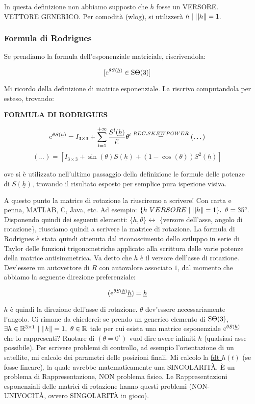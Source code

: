 In questa definizione non abbiamo supposto che $h$ fosse un VERSORE. VETTORE GENERICO. Per comodità (wlog), si utilizzerà $h\ |\ \lVert h\rVert=1$.

\subsubsection{Formula di Rodrigues}

Se prendiamo la formula dell'esponenziale matriciale, riscrivendola:

\[
	[\mathop{}\!\mathrm{e}^{\theta S(\underline{h})} \in\operatorname{S\Theta}(3)]
\]

Mi ricordo della definizione di matrice esponenziale. La riscrivo computandola per esteso, trovando:

\begin{defn}{\textbf{FORMULA DI RODRIGUES}}

\[
	\mathop{}\!\mathrm{e}^{\theta S(\underline{h})} = I_{3\times 3} + \sum_{l=1}^{+\infty}{\frac{S^l(\underline{h})}{l!}\theta^l} \stackrel{REC.SKEWPOWER}{=} (\dots)
\]
\[
	(\dots) = [I_{3\times 3} + \sin(\theta) S(\underline{h}) + (1-\cos(\theta))S^2(\underline{h})]
\]

\end{defn}

ove si è utilizzato nell'ultimo passaggio della definizione le formule delle potenze di $S(\underline{h})$, trovando il risultato esposto per semplice pura ispezione visiva.

A questo punto la matrice di rotazione la riusciremo a scrivere! Con carta e penna, MATLAB, C, Java, etc. Ad esempio: $\{h\ VERSORE\ |\ \norma{h}=1\},\ \theta=35^{\circ}$. Disponendo quindi dei seguenti elementi: $\{h,\theta\} \leftrightarrow$ \{versore dell'asse, angolo di rotazione\}, riusciamo quindi a scrivere la matrice di rotazione. La formula di Rodrigues è stata quindi ottenuta dal riconoscimento dello sviluppo in serie di Taylor delle funzioni trigonometriche applicato alla scrittura delle varie potenze della matrice antisimmetrica. Va detto che $h$ è il versore dell'asse di rotazione. Dev'essere un autovettore di $R$ con autovalore associato $1$, dal momento che abbiamo la seguente direzione preferenziale:

\[
	(\mathop{}\!\mathrm{e}^{\theta S(\underline{h})}\underline{h}) = \underline{h}
\]

$h$ è quindi la direzione dell'asse di rotazione. $\theta$ dev'essere necessariamente l'angolo. Ci rimane da chiederci: se prendo un generico elemento di $\operatorname{S\Theta}(3)$, $\exists h\in\R^{3\times 1}\ |\ \norma{h}=1,\ \theta\in\R$ tale per cui esista una matrice esponenziale $\mathop{}\!\mathrm{e}^{\theta S(\underline{h})}$ che lo rappresenti? Ruotare di $(\theta=0^{\circ})$ vuol dire avere infiniti $h$ (qualsiasi asse possibile). Per scrivere problemi di controllo, ad esempio l'orientazione di un satellite, mi calcolo dei parametri delle posizioni finali. Mi calcolo la \underline{fdt $h(t)$} (se fosse lineare), la quale avrebbe matematicamente una SINGOLARIT\`A. \`E un problema di Rappresentazione, NON problema fisico. Le Rappresentazioni esponenziali delle matrici di rotazione hanno questi problemi (NON-UNIVOCIT\`A, ovvero SINGOLARIT\`A in gioco).

